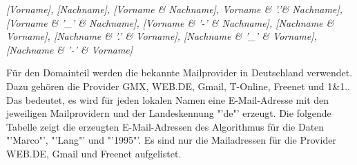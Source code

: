 	\textit{[Vorname], [Nachname], [Vorname \& Nachname], Vorname \& '.'\& Nachname], [Vorname \& '\_' \& Nachname], [Vorname \& '-' \& Nachname], [Nachname \& Vorname], [Nachname \& '.' \& Vorname], [Nachname \& '\_' \& Vorname], [Nachname \& '-' \& Vorname]}
	
	Für den Domainteil werden die bekannte Mailprovider in Deutschland verwendet. Dazu gehören die Provider GMX, WEB.DE, Gmail, T-Online, Freenet und 1\&1.\cite{AnbieterMail}. Das bedeutet, es wird für jeden lokalen Namen eine E-Mail-Adresse mit den jeweiligen Mailprovidern und der Landeskennung "'de"' erzeugt. Die folgende Tabelle  zeigt die erzeugten E-Mail-Adressen des Algorithmus für die Daten "'Marco"', "'Lang"' und "'1995"'. Es sind nur die Mailadressen für die Provider WEB.DE, Gmail und Freenet aufgelistet.
	
	\begin{center}
		\scriptsize
		\begin{longtable}{c|c|c}
			\label{EMailAdressen}


\end{longtable}
\end{center}

